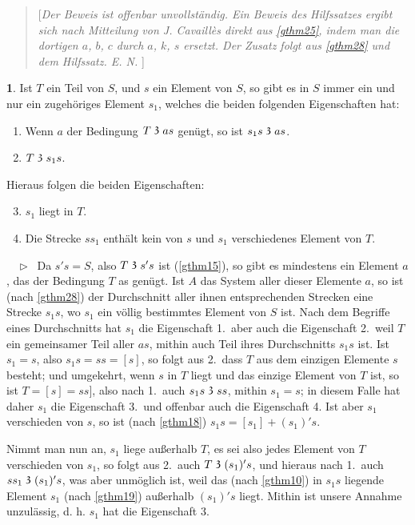 \documentclass[leqno,hidelinks,10pt]{article}
\theoremstyle{definition}
\newtheorem{satz}{\protect\satzname}
\newcommand{\satzname}{}
\renewcommand{\satzname}{\hspace{-4pt}.\ Satz}%
\renewcommand{\satzname}{\hspace{-4pt}.\ Theorem}%
\newcommand\beweis{ $ \phantom{'.'} \rhd \ $}%
\newcommand\TeilVon{\mathrel{\raisebox{0.45ex}{$\mathfrak{3}$}}}
\newcommand{\sref}[1]{\underline{\ref{#1}}}%
\begin{document}
\begin{paracol}{2}
\begin{leftcolumn}
\begin{quote}
[\emph{Der Beweis ist offenbar unvollständig. Ein Beweis des Hilfssatzes ergibt
sich nach Mitteilung von J. Cavaillès direkt aus \sref{gthm25}, indem man die
dortigen $a$, $b$, $c$ durch $a$, $k$, $s$ ersetzt.
Der Zusatz folgt aus \sref{gthm28} und dem Hilfssatz. E. N.
}] \end{quote}

\begin{satz}\label{gthm29}
Ist $T$ ein Teil von $S$, und $s$ ein Element von $S$, so gibt es in $S$ immer ein
und nur ein zugehöriges Element $s_1$, welches die beiden folgenden Eigenschaften hat:
\begin{enumerate} \setcounter{enumi}{0} \setlength\itemsep{-0.25em}
   \item  Wenn $a$ der Bedingung $T \TeilVon as$ genügt, so ist $s_1s \TeilVon as$.
   \item $T \TeilVon s_1s$.
\end{enumerate}

Hieraus folgen die beiden Eigenschaften:
\begin{enumerate} \setcounter{enumi}{2} \setlength\itemsep{-0.25em}
    \item $s_1$ liegt in $T$.
    \item Die Strecke $ss_1$ enthält kein von $s$ und $s_1$ verschiedenes Element von $T$.
\end{enumerate}
\beweis
Da $s's = S$, also $T \TeilVon s's$ ist (\sref{gthm15}), so gibt es mindestens
ein Element $a$, das der Bedingung $T$ as genügt. Ist $A$ das System aller dieser
Elemente $a$, so ist (nach \sref{gthm28}) der Durchschnitt aller ihnen entsprechenden
Strecken eine Strecke $s_1s$, wo $s_1$ ein völlig bestimmtes Element von $S$ ist.
Nach dem Begriffe eines Durchschnitts hat $s_1$ die Eigenschaft 1.\, aber auch die
Eigenschaft 2.\, weil $T$ ein gemeinsamer Teil aller $as$, mithin auch Teil ihres
Durchschnitts $s_1s$ ist. Ist $s_1 = s$, also $s_1s = ss = [s]$, so folgt aus 2.\,
dass $T$ aus dem einzigen Elemente $s$ besteht; und umgekehrt, wenn $s$ in $T$
liegt und das einzige Element von $T$ ist, so ist $T = [s] = ss]$, also nach 1.\
auch $s_1s \TeilVon ss$, mithin $s_1 = s$; in diesem Falle hat daher $s_1$ die
Eigenschaft 3.\ und offenbar auch die Eigenschaft 4. Ist aber $s_1$ verschieden
von $s$, so ist (nach \sref{gthm18}) $s_1s = [s_1] + (s_1)'s$.

Nimmt man nun an, $s_1$ liege außerhalb $T$, es sei also jedes Element von $T$
verschieden von $s_1$, so folgt aus 2.\ auch $T \TeilVon (s_1)'s$, und hieraus
nach 1.\ auch $ss_1 \TeilVon (s_1)'s$, was aber unmöglich ist, weil das (nach
\sref{gthm10}) in $s_1s$ liegende Element $s_1$ (nach \sref{gthm19}) außerhalb
$(s_1)'s$ liegt. Mithin ist unsere Annahme unzulässig, d. h.  $s_1$  hat die
Eigenschaft 3.


\end{satz}
\end{leftcolumn}
\end{paracol}
\end{document}
